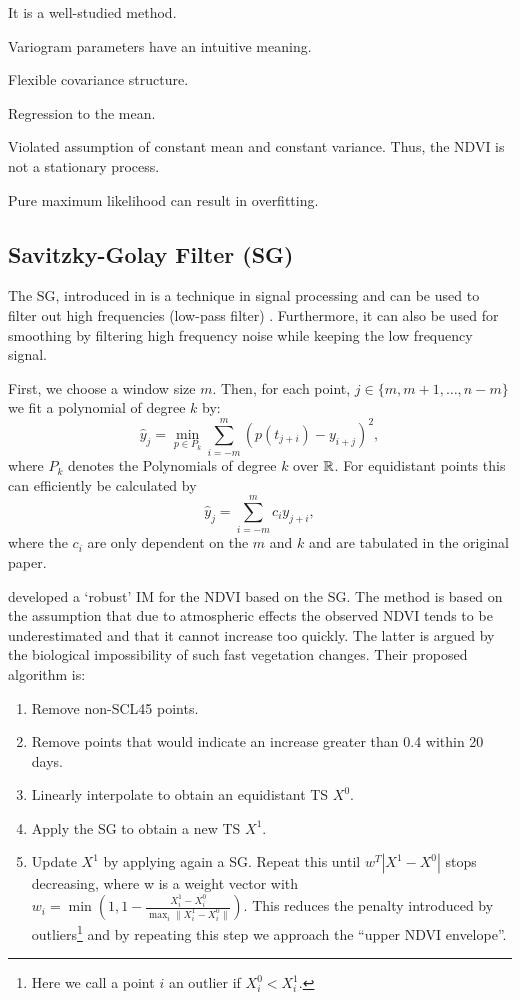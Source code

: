 		\begin{my_pros_cons_table}{
				\item It is a well-studied method.
				\item Variogram parameters have an intuitive meaning.
				\item Flexible covariance structure.
			}{
				\item Regression to the mean.
				\item Violated assumption of constant mean and constant variance. Thus, the NDVI is not a stationary process.
				\item Pure maximum likelihood can result in overfitting.
			}
		\end{my_pros_cons_table}


	\subsection{Savitzky-Golay Filter (SG)}
		\label{sec:Savitzky-Golay}
		The SG, introduced in \cite{savitzkySmoothingDifferentiationData1964} is a technique in signal processing and can be used to filter out high frequencies (low-pass filter) \citep{schaferWhatSavitzkyGolayFilter2011}. Furthermore, it can also be used for smoothing by filtering high frequency noise while keeping the low frequency signal.

		First, we choose a window size $m$. Then, for each point, $j \in \{m, m+1, \dots, n-m\}$ we fit a polynomial of degree $k$ by:
		$$\hat y_j=\min_{p\in P_k}\sum_{i=-m}^{m}(p (t_{j+i})-y_{i+j})^{2},$$
		where $P_k$ denotes the Polynomials of degree $k$ over $\mathbb{R}$.
		For equidistant points this can efficiently be calculated by
		$$
			\hat y_{j}=\sum_{i=-m}^{m} c_{i} y_{j+i},
		$$
		where the $c_i$ are only dependent on the $m$ and $k$ and are tabulated in the original paper.

		\cite{chenSimpleMethodReconstructing2004a} developed a `robust' {{IM}} for the NDVI based on the SG. 
		The method is based on the assumption that due to atmospheric effects the observed NDVI tends to be underestimated and that it cannot increase too quickly. The latter is argued by the biological impossibility of such fast vegetation changes. Their proposed algorithm is:
			\begin{enumerate}
				\item Remove non-SCL45 points.
				\item Remove points that would indicate an increase greater than 0.4 within 20 days.
				\item Linearly interpolate to obtain an equidistant {TS} $X^0$.
				\item Apply the SG to obtain a new {TS} $X^1$.
				\item Update $X^1$ by applying again a SG. Repeat this until $w^T |X^1-X^0|$ stops decreasing, where w is a weight vector with $w_i = \min\left(1, 1 - \frac{X^1_i-X^0_i}{\max_i\|X^1_i-X^0_i\|}\right)$. This reduces the penalty introduced by outliers\footnote{Here we call a point $i$ an outlier if $X^0_i<X^1_i$.} and by repeating this step we approach the ``upper NDVI envelope''.
			\end{enumerate}

